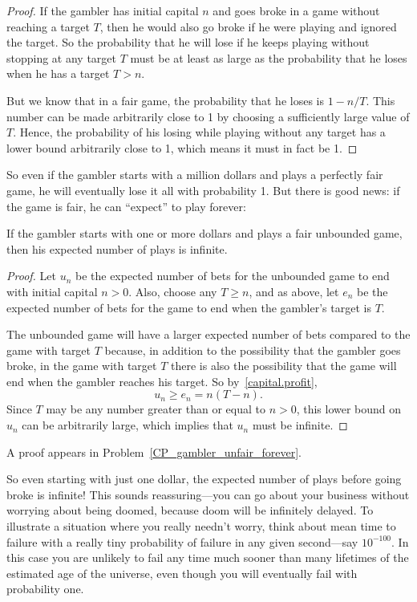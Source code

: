 \begin{proof}
If the gambler has initial capital $n$ and goes broke in a game without
reaching a target $T$, then he would also go broke if he were playing and
ignored the target.  So the probability that he will lose if he keeps
playing without stopping at any target $T$ must be at least as large as the
probability that he loses when he has a target $T>n$.

But we know that in a fair game, the probability that he loses is $1 -
n/T$.  This number can be made arbitrarily close to 1 by choosing a
sufficiently large value of $T$.  Hence, the probability of his losing
while playing without any target has a lower bound arbitrarily close to 1,
which means it must in fact be 1.
\end{proof}

So even if the gambler starts with a million dollars and plays a
perfectly fair game, he will eventually lose it all with probability
1.  But there is good news: if the game is fair, he can ``expect'' to
play forever:

\begin{lemma}\label{LN12:play forever}
If the gambler starts with one or more dollars and plays a fair
unbounded game, then his expected number of plays is infinite.
\end{lemma}

\begin{editingnotes}
\begin{proof}
Let $u_n$ be the expected number of bets for the unbounded game
to end with initial capital $n>0$.  Also, choose any $T \geq n$, and as
above, let $e_n$ be the expected number of bets for the game to end
when the gambler's target is $T$.

The unbounded game will have a larger expected number of bets compared
to the game with target $T$ because, in addition to the possibility
that the gambler goes broke, in the game with target $T$ there is also
the possibility that the game will end when the gambler reaches his
target.  So by~\eqref{capital.profit},
\[
u_n \geq e_n = n(T-n).
\]
Since $T$ may be any number greater than or equal to $n>0$, this lower
bound on $u_n$ can be arbitrarily large, which implies that $u_n$ must
be infinite.
\end{proof}
\end{editingnotes}

A proof appears in Problem~\ref{CP_gambler_unfair_forever}.

So even starting with just one dollar, the expected number of plays
before going broke is infinite!  This sounds reassuring---you can go
about your business without worrying about being doomed, because doom
will be infinitely delayed.  To illustrate a situation where you
really needn't worry, think about mean time to failure with a really
tiny probability of failure in any given second---say $10^{-100}$.  In
this case you are unlikely to fail any time much sooner than many
lifetimes of the estimated age of the universe, even though you will
eventually fail with probability one.

